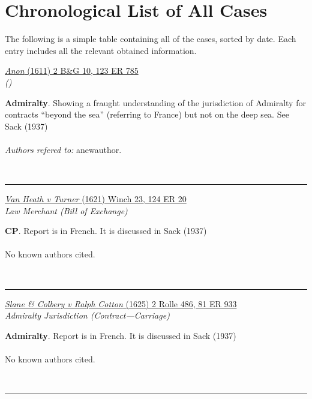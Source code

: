 \documentclass[twoside]{article}
\begin{document}
\section{Chronological List of All Cases}

The following is a simple table containing all of the cases, sorted by date. Each entry includes all the relevant obtained information.
\\ 


        \begin{small}
        \begin{center}
        \href{https://heinonline.org/HOL/P?h=hein.engrep/engrg0123&i=789}{\textit{Anon} (1611) 2 B\&G 10, 123 ER 785} \label{5} \\ 
\textit{ ()}\\
        \end{center}
        \textbf{Admiralty}. Showing a fraught understanding of the jurisdiction of Admiralty for contracts “beyond the sea” (referring to France) but not on the deep sea. See Sack (1937)\\\\\textit{Authors refered to: }anewauthor.
        \end{small}\\
        \rule{\textwidth}{0.5pt}
        

        \begin{small}
        \begin{center}
        \href{https://heinonline.org/HOL/P?h=hein.engrep/engrg0124&i=24}{\textit{Van Heath v Turner} (1621) Winch 23, 124 ER 20} \label{3} \\ 
\textit{Law Merchant (Bill of Exchange)}\\
        \end{center}
        \textbf{CP}. Report is in French. It is discussed in Sack (1937)\\\\No known authors cited.
        \end{small}\\
        \rule{\textwidth}{0.5pt}
        

        \begin{small}
        \begin{center}
        \href{https://heinonline.org/HOL/P?h=hein.engrep/engrf0081&i=937}{\textit{Slane \& Colbery v Ralph Cotton} (1625) 2 Rolle 486, 81 ER 933} \label{6} \\ 
\textit{Admiralty Jurisdiction (Contract---Carriage)}\\
        \end{center}
        \textbf{Admiralty}. Report is in French. It is discussed in Sack (1937)\\\\No known authors cited.
        \end{small}\\
        \rule{\textwidth}{0.5pt}
        
\end{document}
